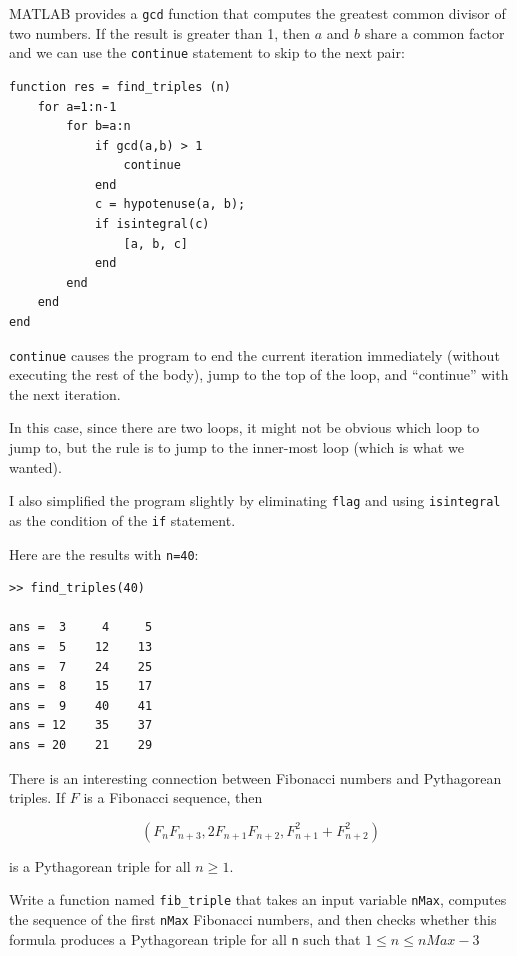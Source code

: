 \documentclass[
]{book}
\begin{document}
MATLAB provides a {\tt gcd} function that computes the greatest common
divisor of two numbers.  If the result is greater than 1, then
$a$ and $b$ share a common factor and we can use the {\tt continue}
statement to skip to the next pair:

\begin{verbatim}
function res = find_triples (n)
    for a=1:n-1
        for b=a:n
            if gcd(a,b) > 1
                continue
            end
            c = hypotenuse(a, b);
            if isintegral(c)
                [a, b, c]
            end
        end
    end
end
\end{verbatim}

{\tt continue} causes the program to end the current iteration
immediately (without executing the rest of the body), jump to
the top of the loop, and ``continue'' with the next iteration.

In this case, since there are two loops, it might not be obvious
which loop to jump to, but the rule is to jump to the inner-most
loop (which is what we wanted).

I also simplified the program slightly by eliminating
{\tt flag} and using {\tt isintegral} as the condition of the
{\tt if} statement.

Here are the results with {\tt n=40}:

\begin{verbatim}
>> find_triples(40)

ans =  3     4     5
ans =  5    12    13
ans =  7    24    25
ans =  8    15    17
ans =  9    40    41
ans = 12    35    37
ans = 20    21    29
\end{verbatim}

There is an interesting connection between Fibonacci numbers and
Pythagorean triples.  If $F$ is a Fibonacci sequence, then

\begin{equation}
(F_n F_{n+3}, 2 F_{n+1} F_{n+2}, F_{n+1}^2 + F_{n+2}^2 )
\end{equation}

is a Pythagorean triple for all $n \ge 1$.

\begin{ex}
Write a function named {\tt fib\_triple} that
takes an input variable {\tt nMax}, computes the sequence of 
the first {\tt nMax} Fibonacci numbers, and then checks whether
this formula produces a Pythagorean triple for all {\tt n} such that 
$ 1 \leq n \leq nMax-3 $
\end{ex}
\end{document}
